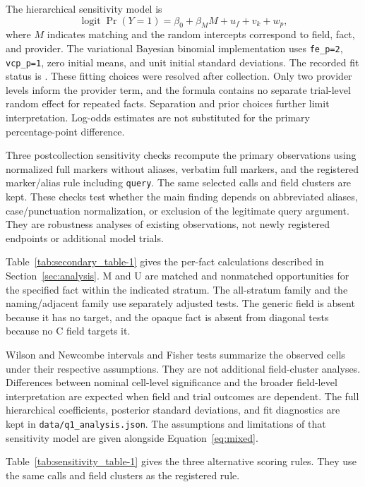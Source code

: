 \documentclass[final,5p,times,twocolumn]{elsarticle}
\begin{document}
The hierarchical sensitivity model is
\begin{equation}
\operatorname{logit}\Pr(Y=1)=\beta_0+\beta_M M+u_f+v_k+w_p,
\label{eq:mixed}
\end{equation}
where $M$ indicates matching and the random intercepts correspond to field,
fact, and provider. The variational Bayesian binomial implementation uses
\texttt{fe\_p=2}, \texttt{vcp\_p=1}, zero initial means, and unit initial
standard deviations. The recorded fit status is \JournalMixedStatus{}.
These fitting choices were resolved after collection. Only two provider levels
inform the provider term, and the formula contains no separate trial-level
random effect for repeated facts. Separation and prior choices further limit
interpretation. Log-odds estimates are not substituted for the primary
percentage-point difference.

Three postcollection sensitivity checks recompute the primary observations
using normalized full markers without aliases, verbatim full markers, and the
registered marker/alias rule including \texttt{query}. The same selected calls
and field clusters are kept. These checks test whether the main finding
depends on abbreviated aliases, case/punctuation normalization, or exclusion
of the legitimate query argument. They are robustness analyses of existing
observations, not newly registered endpoints or additional model trials.

Table~\ref{tab:secondary_table-1} gives the per-fact calculations described in
Section~\ref{sec:analysis}. M and U are matched and nonmatched opportunities
for the specified fact within the indicated stratum. The all-stratum family
and the naming/adjacent family use separately adjusted tests. The generic
field is absent because it has no target, and the opaque fact is absent from
diagonal tests because no C field targets it.

Wilson and Newcombe intervals and Fisher tests summarize the observed cells
under their respective assumptions. They are not additional field-cluster
analyses. Differences between nominal cell-level significance and the broader
field-level interpretation are expected when field and trial outcomes are
dependent. The full hierarchical coefficients, posterior standard deviations,
and fit diagnostics are kept in \texttt{data/q1\_analysis.json}. The
assumptions and limitations of that sensitivity model are given alongside
Equation~\ref{eq:mixed}.

Table~\ref{tab:sensitivity_table-1} gives the three alternative scoring rules.
They use the same calls and field clusters as the registered rule.

\end{document}
